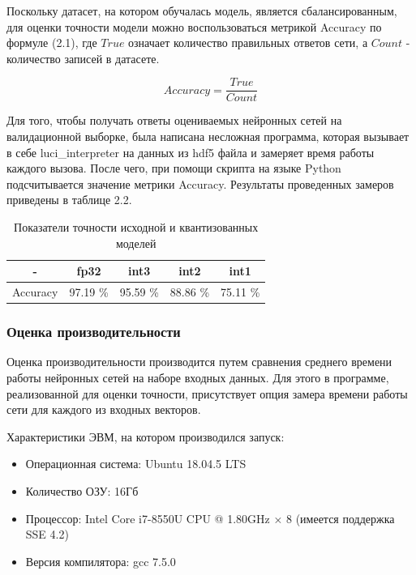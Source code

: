 Поскольку датасет, на котором обучалась модель, является сбалансированным, для оценки точности модели можно воспользоваться метрикой Accuracy по формуле (2.1), где $True$ означает количество правильных ответов сети, а $Count$ - количество записей в датасете.

\begin{equation}
Accuracy = \frac{True}{Count}
\end{equation}

Для того, чтобы получать ответы оцениваемых нейронных сетей на валидационной выборке, была написана несложная программа,  которая вызывает в себе luci\_interpreter на данных из hdf5 файла и замеряет время работы каждого вызова. После чего, при помощи скрипта на языке Python подсчитывается значение метрики Accuracy. Результаты проведенных замеров приведены в таблице 2.2.

\begin{table}[H]
\caption{Показатели точности исходной и квантизованных моделей}
\begin{center}
\begin{tabular}{|c|c|c|c|c|}
\hline
 -  & fp32 & int3 & int2 & int1 \\
\hline
Accuracy & 97.19 \% & 95.59 \% & 88.86 \% & 75.11 \% \\
\hline
\end{tabular}
\end{center}
\end{table}

\subsubsection{Оценка производительности}

Оценка производительности производится путем сравнения среднего времени работы нейронных сетей на наборе входных данных. Для этого в программе, реализованной для оценки точности, присутствует опция замера времени работы сети для каждого из входных векторов.

Характеристики ЭВМ, на котором производился запуск:
\begin{itemize}
    \item Операционная система: Ubuntu 18.04.5 LTS
    \item Количество ОЗУ: 16Гб
    \item Процессор: Intel Core i7-8550U CPU @ 1.80GHz × 8 (имеется поддержка SSE 4.2)
    \item Версия компилятора: gcc 7.5.0
\end{itemize}

